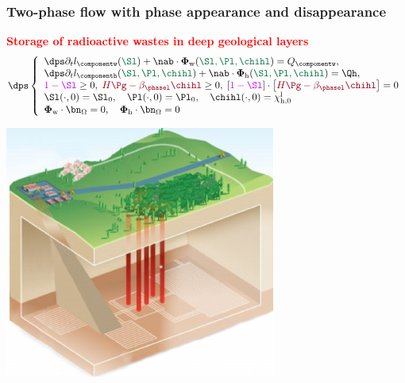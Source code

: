 \begin{frame}
  \frametitle{Two-phase flow with phase appearance and disappearance}
  \begin{minipage}{0.65 \textwidth}
  \textcolor{red}{\textbf{Storage of radioactive wastes in deep geological layers}}
\vspace*{-0.2 cm}
\begin{equation*}
\dps
\left\lbrace\begin{array}{llccc}
\dps \partial_t l_\componentw(\textcolor{cadmiumgreen}{\Sl}) + \nab \cdot {\bm \Phi}_{\mathrm{w}}(\textcolor{cadmiumgreen}{\Sl,\Pl,\chihl}) = Q_{\componentw}, \\
\dps \partial_t l_\componenth(\textcolor{cadmiumgreen}{\Sl,\Pl,\chihl})  + \nab \cdot {\bm \Phi}_{\mathrm{h}}(\textcolor{cadmiumgreen}{\Sl,\Pl,\chihl})=\Qh,\\
\textcolor{electricpurple}{1 - \Sl} \geq 0, \;  \textcolor{carmine}{H \Pg - \beta_{\phasel} \chihl} \geq 0, \; \left[\textcolor{electricpurple}{1 - \Sl} \right] \cdot \left[\textcolor{carmine}{H \Pg - \beta_{\phasel} \chihl}\right]=0   \\
\Sl(\cdot, 0) = \Sl_0, \quad \Pl(\cdot, 0) = \Pl_0, \quad \chihl(\cdot, 0) = \chi_{\mathrm{h}, 0}^{\mathrm{l}} \\
{\bm \Phi}_{\mathrm{w}}\cdot \bn_{\Omega} = 0, \quad {\bm \Phi}_{\mathrm{h}}\cdot \bn_{\Omega} = 0 
\end{array}
\right.
\end{equation*}
  \end{minipage}
  \hfill
  \begin{minipage}{0.34 \textwidth}
\includegraphics[scale = 0.6]{stockage_radioactifs}
    \end{minipage}
\vspace{0.1 cm}

\end{frame}
